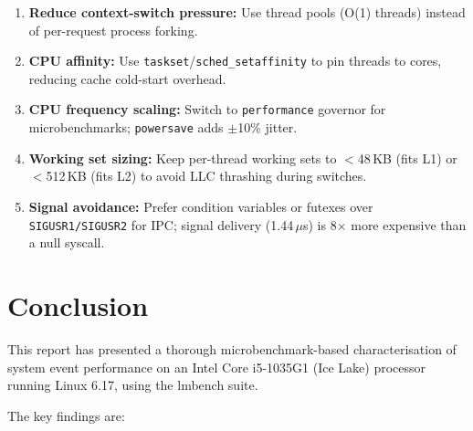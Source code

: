 \documentclass[12pt,a4paper]{article}
\newcommand{\us}{$\mu$s}
\begin{document}
\begin{keybox}
\begin{enumerate}[label=\arabic*., noitemsep]
    \item \textbf{Reduce context-switch pressure:} Use thread pools (O(1)
    threads) instead of per-request process forking.
    \item \textbf{CPU affinity:} Use \texttt{taskset}/\texttt{sched\_setaffinity}
    to pin threads to cores, reducing cache cold-start overhead.
    \item \textbf{CPU frequency scaling:} Switch to \texttt{performance}
    governor for microbenchmarks; \texttt{powersave} adds $\pm$10\% jitter.
    \item \textbf{Working set sizing:} Keep per-thread working sets to $<$48\,KB
    (fits L1) or $<$512\,KB (fits L2) to avoid LLC thrashing during switches.
    \item \textbf{Signal avoidance:} Prefer condition variables or futexes over
    \texttt{SIGUSR1/SIGUSR2} for IPC; signal delivery (1.44\,\us) is 8$\times$
    more expensive than a null syscall.
\end{enumerate}
\end{keybox}

\section{Conclusion}
\label{sec:conclusion}

This report has presented a thorough microbenchmark-based characterisation of
system event performance on an Intel Core i5-1035G1 (Ice Lake) processor
running Linux 6.17, using the lmbench suite.

The key findings are:
\end{document}
